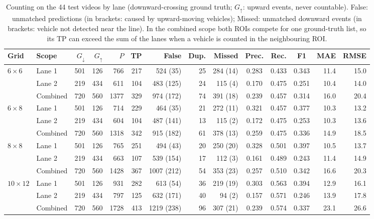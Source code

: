 \documentclass[conference]{IEEEtran}
\begin{document}
\begin{table}[t]
\centering
\caption{Counting on the 44 test videos by lane (downward-crossing ground truth; $G_{\uparrow}$:
upward events, never countable). False: unmatched predictions (in brackets: caused by
upward-moving vehicles); Missed: unmatched downward events (in brackets: vehicle not detected
near the line). In the combined scope both ROIs compete for one ground-truth list, so its
TP can exceed the sum of the lanes when a vehicle is counted in the neighbouring ROI.}
\label{tab:count}
\scriptsize
\setlength{\tabcolsep}{3.4pt}
\begin{tabular}{llrrrrrrrcccrr}
\toprule
\textbf{Grid} & \textbf{Scope} & $G_{\downarrow}$ & $G_{\uparrow}$ & $P$ & \textbf{TP} & \textbf{False} & \textbf{Dup.} & \textbf{Missed} & \textbf{Prec.} & \textbf{Rec.} & \textbf{F1} & \textbf{MAE} & \textbf{RMSE}\\
\midrule
$6{\times}6$ & Lane 1 & 501 & 126 & 766 & 217 & 524 (35) & 25 & 284 (14) & 0.283 & 0.433 & 0.343 & 11.4 & 15.0\\
 & Lane 2 & 219 & 434 & 611 & 104 & 483 (125) & 24 & 115 (4) & 0.170 & 0.475 & 0.251 & 10.4 & 14.0\\
 & Combined & 720 & 560 & 1377 & 329 & 974 (172) & 74 & 391 (18) & 0.239 & 0.457 & 0.314 & 16.0 & 20.4\\
\midrule
$6{\times}8$ & Lane 1 & 501 & 126 & 714 & 229 & 464 (35) & 21 & 272 (11) & 0.321 & 0.457 & 0.377 & 10.3 & 13.2\\
 & Lane 2 & 219 & 434 & 604 & 104 & 487 (141) & 13 & 115 (2) & 0.172 & 0.475 & 0.253 & 10.3 & 13.6\\
 & Combined & 720 & 560 & 1318 & 342 & 915 (182) & 61 & 378 (13) & 0.259 & 0.475 & 0.336 & 14.9 & 18.5\\
\midrule
$8{\times}8$ & Lane 1 & 501 & 126 & 765 & 251 & 494 (43) & 20 & 250 (20) & 0.328 & 0.501 & 0.397 & 10.5 & 13.7\\
 & Lane 2 & 219 & 434 & 663 & 107 & 539 (154) & 17 & 112 (3) & 0.161 & 0.489 & 0.243 & 11.4 & 14.9\\
 & Combined & 720 & 560 & 1428 & 367 & 1007 (212) & 54 & 353 (23) & 0.257 & 0.510 & 0.342 & 16.6 & 20.3\\
\midrule
$10{\times}12$ & Lane 1 & 501 & 126 & 931 & 282 & 613 (54) & 36 & 219 (19) & 0.303 & 0.563 & 0.394 & 12.9 & 16.1\\
 & Lane 2 & 219 & 434 & 797 & 125 & 632 (171) & 40 & 94 (2) & 0.157 & 0.571 & 0.246 & 13.9 & 17.8\\
 & Combined & 720 & 560 & 1728 & 413 & 1219 (238) & 96 & 307 (21) & 0.239 & 0.574 & 0.337 & 23.1 & 26.6\\
\bottomrule
\end{tabular}
\end{table}
\end{document}
